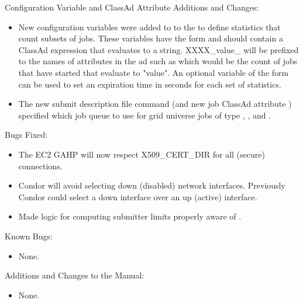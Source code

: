 \noindent Configuration Variable and ClassAd Attribute Additions and Changes:

\begin{itemize}

\item New configuration variables were added to to the  to
define statistics that count subsets of jobs. These variables
have the form  and should contain
a ClassAd expression that evaluates to a string.
XXXX\_value\_ will be prefixed to the names of attributes in the  ad
such as  which would be the count of jobs that have
started that evaluate to "value".  An optional variable of the form
 can be used to set an expiration time in seconds
for each set of statistics.

\item The new  submit description file command
(and new job ClassAd attribute ) specified which job
queue to use for grid universe jobs of type
, , and .

\end{itemize}

\noindent Bugs Fixed:

\begin{itemize}

\item The EC2 GAHP will now respect X509_CERT_DIR for all (secure) connections.

\item Condor will avoid selecting down (disabled) network interfaces.  Previously Condor could select a down interface over an up (active) interface.

\item Made  logic for computing submitter limits properly aware of .

\end{itemize}

\noindent Known Bugs:

\begin{itemize}

\item None.

\end{itemize}

\noindent Additions and Changes to the Manual:

\begin{itemize}

\item None.

\end{itemize}


